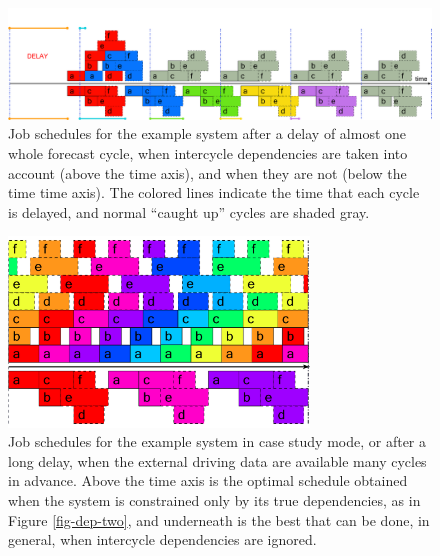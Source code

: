 \documentclass[11pt,a4paper]{article}
\begin{document}
\begin{figure} \begin{center}
    \includegraphics[width=12cm]{timeline-three} \end{center}
    \caption{\small Job schedules for the example system after a delay
    of almost one whole forecast cycle, when intercycle dependencies are
    taken into account (above the time axis), and when they are not
    (below the time time axis). The colored lines indicate the time that
    each cycle is delayed, and normal ``caught up'' cycles
    are shaded gray.} 
    \label{fig-time-three}
\end{figure} 
\begin{figure} 
    \begin{center} 
        \includegraphics[width=8cm]{timeline-two}
    \end{center} 
    \caption{\small Job schedules for the example system in case study
    mode, or after a long delay, when the external driving data are
    available many cycles in advance. Above the time axis is the optimal
    schedule obtained when the system is constrained only by its true
    dependencies, as in Figure \ref{fig-dep-two}, and underneath is
    the best that can be done, in general, when intercycle dependencies
    are ignored.} 
    \label{fig-time-two}
\end{figure} 
\end{document}
